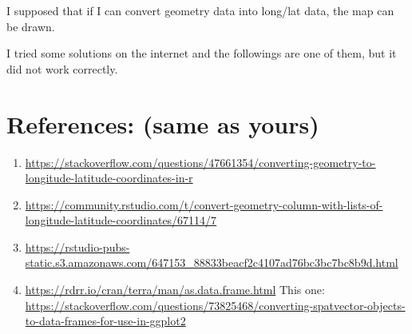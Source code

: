 \documentclass[
]{article}
\providecommand{\tightlist}{%
  \setlength{\itemsep}{0pt}\setlength{\parskip}{0pt}}
\begin{document}
I supposed that if I can convert geometry data into long/lat data, the
map can be drawn.

I tried some solutions on the internet and the followings are one of
them, but it did not work correctly.

\hypertarget{references-same-as-yours}{%
\section{References: (same as yours)}\label{references-same-as-yours}}

\begin{enumerate}
\def\labelenumi{\arabic{enumi}.}
\tightlist
\item
  \url{https://stackoverflow.com/questions/47661354/converting-geometry-to-longitude-latitude-coordinates-in-r}
\item
  \url{https://community.rstudio.com/t/convert-geometry-column-with-lists-of-longitude-latitude-coordinates/67114/7}
\item
  \url{https://rstudio-pubs-static.s3.amazonaws.com/647153_88833beacf2c4107ad76bc3bc7bc8b9d.html}
\item
  \url{https://rdrr.io/cran/terra/man/as.data.frame.html} This one:
  \url{https://stackoverflow.com/questions/73825468/converting-spatvector-objects-to-data-frames-for-use-in-ggplot2}
\end{enumerate}
\end{document}
